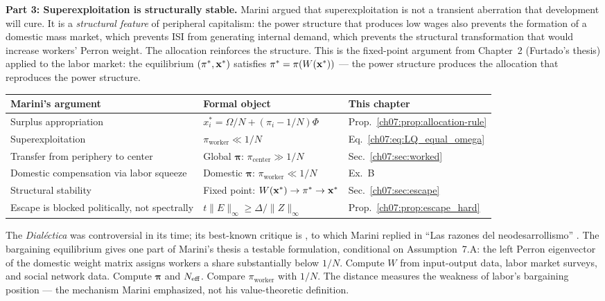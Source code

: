 \documentclass[../structural_economics_book.tex]{subfiles}
\begin{document}
\textbf{Part 3: Superexploitation is structurally stable.} Marini argued that superexploitation is not a transient aberration that development will cure. It is a \textit{structural feature} of peripheral capitalism: the power structure that produces low wages also prevents the formation of a domestic mass market, which prevents ISI from generating internal demand, which prevents the structural transformation that would increase workers' Perron weight. The allocation reinforces the structure. This is the fixed-point argument from Chapter~2 (Furtado's thesis) applied to the labor market: the equilibrium $(\pi^*, \mathbf{x}^*)$ satisfies $\pi^* = \pi(W(\mathbf{x}^*))$ --- the power structure produces the allocation that reproduces the power structure.

\begin{center}
\begin{tabularx}{\textwidth}{LLL}
\toprule
\textbf{Marini's argument} & \textbf{Formal object} & \textbf{This chapter} \\
\midrule
Surplus appropriation & $x_i^* = \Omega/N + (\pi_i - 1/N)\Phi$ & Prop.~\ref{ch07:prop:allocation-rule} \\
Superexploitation & $\pi_{\text{worker}} \ll 1/N$ & Eq.~\eqref{ch07:eq:LQ_equal_omega} \\
Transfer from periphery to center & Global $\boldsymbol{\pi}$: $\pi_{\text{center}} \gg 1/N$ & Sec.~\ref{ch07:sec:worked} \\
Domestic compensation via labor squeeze & Domestic $\boldsymbol{\pi}$: $\pi_{\text{worker}} \ll 1/N$ & Ex.~B \\
Structural stability & Fixed point: $W(\mathbf{x}^*) \to \pi^* \to \mathbf{x}^*$ & Sec.~\ref{ch07:sec:escape} \\
Escape is blocked politically, not spectrally & $t\|E\|_\infty \geq \Delta/\|Z\|_\infty$ & Prop.~\ref{ch07:prop:escape_hard} \\
\bottomrule
\end{tabularx}
\end{center}

The \textit{Dial\'{e}ctica} was controversial in its time; its best-known critique is \citet{cardoso1978desventuras}, to which Marini replied in ``Las razones del neodesarrollismo'' \citeyearpar{marini1978razones}. The bargaining equilibrium gives one part of Marini's thesis a testable formulation, conditional on Assumption~7.A: the left Perron eigenvector of the domestic weight matrix assigns workers a share substantially below $1/N$. Compute $W$ from input-output data, labor market surveys, and social network data. Compute $\boldsymbol{\pi}$ and $N_{\text{eff}}$. Compare $\pi_{\text{worker}}$ with $1/N$. The distance measures the weakness of labor's bargaining position --- the mechanism Marini emphasized, not his value-theoretic definition.
\end{document}
